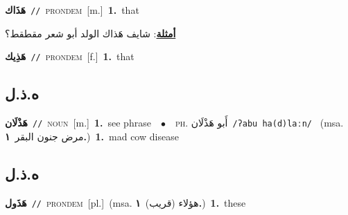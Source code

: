 \documentclass[10pt,a4paper,twoside]{article} %
\begin{document}
\begin{multicols}{2}
{\setlength\topsep{0pt}\textbf{\foreignlanguage{arabic}{هَذَاك}}\ {\color{gray}\texttt{//}\color{black}}\ \textsc{pron\textunderscore dem}\ [m.]\ \textbf{1.}~that\  \begin{flushright}\color{gray}\foreignlanguage{arabic}{\textbf{\underline{\foreignlanguage{arabic}{أمثلة}}}: شايف هَذاك الولد أبو شعر مقطقط؟}\end{flushright}\color{black}} \vspace{2mm}

{\setlength\topsep{0pt}\textbf{\foreignlanguage{arabic}{هَذِيك}}\ {\color{gray}\texttt{//}\color{black}}\ \textsc{pron\textunderscore dem}\ [f.]\ \textbf{1.}~that\ } \vspace{2mm}

\vspace{-3mm}
\subsection*{\color{blue}\foreignlanguage{arabic}{ه.ذ.ل}\color{blue}{}} 

{\setlength\topsep{0pt}\textbf{\foreignlanguage{arabic}{هَذْلَان}}\ {\color{gray}\texttt{//}\color{black}}\ \textsc{noun}\ [m.]\ \textbf{1.}~see phrase\ \ $\bullet$\ \ \textsc{ph.} \color{gray} \foreignlanguage{arabic}{أَبو هَذْلَان}\color{black}\ {\color{gray}\texttt{/{\sffamily ʔabu ha(d)laːn}/}\color{black}}\ \color{gray} (msa. \foreignlanguage{arabic}{مرض جنون البقر}~\foreignlanguage{arabic}{\textbf{١.}})\color{black}\ \textbf{1.}~mad cow disease\ } \vspace{2mm}

\vspace{-3mm}
\subsection*{\color{blue}\foreignlanguage{arabic}{ه.ذ.ل}\color{blue}{ (ntws)}} 

{\setlength\topsep{0pt}\textbf{\foreignlanguage{arabic}{هَذَول}}\ {\color{gray}\texttt{//}\color{black}}\ \textsc{pron\textunderscore dem}\ [pl.]\ \color{gray}(msa. \foreignlanguage{arabic}{هؤلاء (قريب)}~\foreignlanguage{arabic}{\textbf{١.}})\color{black}\ \textbf{1.}~these\ } \vspace{2mm}


\end{multicols}
\end{document}
